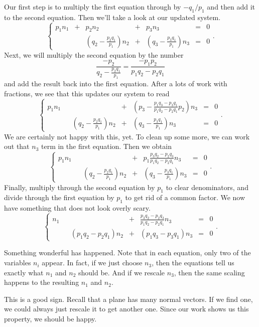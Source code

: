 \documentclass[00-livre-main.tex]{subfiles}
\begin{document}
Our first step is to multiply the first equation through by $-q_1/p_1$ and then add it to the second equation. Then we'll take a look at our updated system.
\[
\left\{ \begin{array}{rrrrrrr}
p_1 n_1 & + & p_2 n_2 & + & p_3 n_3 & = & 0 \\
& &\left(q_2-\frac{p_2q_1}{p_1}\right) n_2 & + & \left(q_3-\frac{p_3q_1}{p_1}\right) n_3 & = & 0 
\end{array}\right. .
\]
Next, we will multiply the second equation by the number 
\[
\frac{-p_2}{q_2 - \frac{p_2q_1}{p_1}} = \frac{-p_1p_2}{p_1q_2 - p_2q_1}
\] 
and add the result back into the first equation. After a lots of work with fractions, we see that this updates our system to read
\[
\left\{ \begin{array}{rrrrrrr}
p_1 n_1 &  &  & + & \left(p_3 -\frac{p_1q_3-p_3q_1}{p_1q_2 - p_2q_1}p_2  \right) n_3 & = & 0 \\
& &\left(q_2-\frac{p_2q_1}{p_1}\right) n_2 & + & \left(q_3-\frac{p_3q_1}{p_1}\right) n_3 & = & 0 
\end{array}\right. .
\]
We are certainly not happy with this, yet. To clean up some more, we can work out that $n_3$ term in the first equation. Then we obtain
\[
\left\{ \begin{array}{rrrrrrr}
p_1 n_1 &  &  & + & p_1\frac{p_3q_2 - p_2q_3}{p_1q_2-p_2q_1} n_3 & = & 0 \\
& &\left(q_2-\frac{p_2q_1}{p_1}\right) n_2 & + & \left(q_3-\frac{p_3q_1}{p_1}\right) n_3 & = & 0
\end{array}\right. .
\]
Finally, multiply through the second equation by $p_1$ to clear denominators, and divide through the first equation by $p_1$ to get rid of a common factor. We now have something that does not look overly scary.
\[
\left\{ \begin{array}{rrrrrrr}
n_1 &  &  & + & \frac{p_3q_2 - p_2q_3}{p_1q_2-p_2q_1} n_3 & = & 0 \\
& &(p_1q_2-p_2q_1) n_2 & + & (p_1q_3-p_3q_1) n_3 & = & 0 
\end{array}\right. .
\]



Something wonderful has happened. Note that in each equation, only two of the variables $n_i$ appear. In fact, if we just choose $n_3$, then the equations tell us exactly what $n_1$ and $n_2$ should be. And if we rescale $n_3$, then the same scaling happens to the resulting $n_1$ and $n_2$. 

This is a good sign. Recall that a plane has many normal vectors. If we find one, we could always just rescale it to get another one. Since our work shows us this property, we should be happy. 
\end{document}
